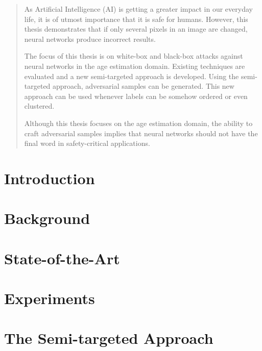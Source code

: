 \documentclass[draft,final]{vutinfth} %
\begin{document}
\begin{abstract}
As Artificial Intelligence (AI) is getting a greater impact in our everyday life, it is of utmost importance that it is safe for humans. However, this thesis demonstrates that if only several pixels in an image are changed, neural networks produce incorrect results. 

The focus of this thesis is on white-box and black-box attacks against neural networks in the age estimation domain. Existing techniques are evaluated and a new semi-targeted approach is developed. Using the semi-targeted approach, adversarial samples can be generated. This new approach can be used whenever labels can be somehow ordered or even clustered.

Although this thesis focuses on the age estimation domain, the ability to craft adversarial samples implies that neural networks should not have the final word in safety-critical applications.
\end{abstract}

\tableofcontents %

\mainmatter

\chapter{Introduction}


\chapter{Background}


\chapter{State-of-the-Art}
\label{chap:attacks}


\chapter{Experiments}
\label{chap:experiments}


\chapter{The Semi-targeted Approach}
\label{chap:semi-targeted}

\end{document}
